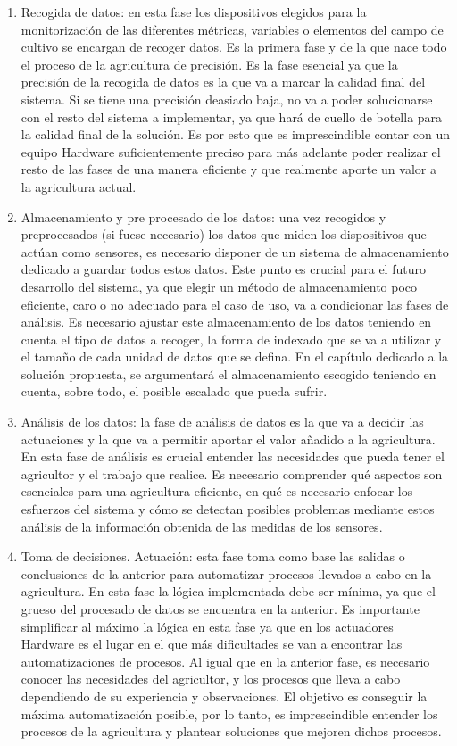 \documentclass[../../memoria.tex]{subfiles}
\begin{document}
\begin{enumerate}
  \item Recogida de datos: en esta fase los dispositivos elegidos para la monitorización de las diferentes métricas, variables o elementos del campo de cultivo se encargan de recoger datos. Es la primera fase y de la que nace todo el proceso de la agricultura de precisión. Es la fase esencial ya que la precisión de la recogida de datos es la que va a marcar la calidad final del sistema. Si se tiene una precisión deasiado baja, no va a poder solucionarse con el resto del sistema a implementar, ya que hará de cuello de botella para la calidad final de la solución. Es por esto que es imprescindible contar con un equipo Hardware suficientemente preciso para más adelante poder realizar el resto de las fases de una manera eficiente y que realmente aporte un valor a la agricultura actual.

  \item Almacenamiento y pre procesado de los datos: una vez recogidos y preprocesados (si fuese necesario) los datos que miden los dispositivos que actúan como sensores, es necesario disponer de un sistema de almacenamiento dedicado a guardar todos estos datos. Este punto es crucial para el futuro desarrollo del sistema, ya que elegir un método de almacenamiento poco eficiente, caro o no adecuado para el caso de uso, va a condicionar las fases de análisis. Es necesario ajustar este almacenamiento de los datos teniendo en cuenta el tipo de datos a recoger, la forma de indexado que se va a utilizar y el tamaño de cada unidad de datos que se defina. En el capítulo dedicado a la solución propuesta, se argumentará el almacenamiento escogido teniendo en cuenta, sobre todo, el posible escalado que pueda sufrir.

  \item  Análisis de los datos: la fase de análisis de datos es la que va a decidir las actuaciones y la que va a permitir aportar el valor añadido a la agricultura. En esta fase de análisis es crucial entender las necesidades que pueda tener el agricultor y el trabajo que realice. Es necesario comprender qué aspectos son esenciales para una agricultura eficiente, en qué es necesario enfocar los esfuerzos del sistema y cómo se detectan posibles problemas mediante estos análisis de la información obtenida de las medidas de los sensores.

  \item  Toma de decisiones. Actuación: esta fase toma como base las salidas o conclusiones de la anterior para automatizar procesos llevados a cabo en la agricultura. En esta fase la lógica implementada debe ser mínima, ya que el grueso del procesado de datos se encuentra en la anterior. Es importante simplificar al máximo la lógica en esta fase ya que en los actuadores Hardware es el lugar en el que más dificultades se van a encontrar las automatizaciones de procesos. Al igual que en la anterior fase, es necesario conocer las necesidades del agricultor, y los procesos que lleva a cabo dependiendo de su experiencia y observaciones. El objetivo es conseguir la máxima automatización posible, por lo tanto, es imprescindible entender los procesos de la agricultura y plantear soluciones que mejoren dichos procesos.


\end{enumerate}
\end{document}

